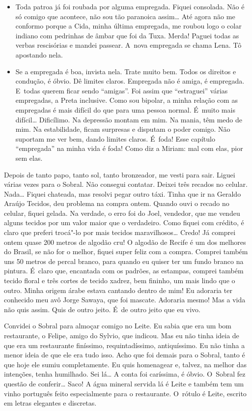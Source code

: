 \begin{itemize}
\item
  Toda patroa já foi roubada por alguma empregada. Fiquei consolada. Não
  é só comigo que acontece, não sou tão paranoica assim… Até
  agora não me conformo porque a Cida, minha última empregada, me roubou
  logo o colar indiano com pedrinhas de âmbar que foi da Tuxa. Merda!
  Paguei todas as verbas rescisórias e mandei passear. A~nova empregada
  se chama Lena. Tô apostando nela.
\item
  Se a empregada é boa, invista nela. Trate muito bem. Todos os direitos
  e condução, é óbvio. Dê limites claros. Empregada não é amiga, é
  empregada. E~todas querem ficar sendo ``amigas''. Foi assim que
  ``estraguei'' várias empregadas, a Preta inclusive. Como sou bipolar,
  a minha relação com as empregadas é mais difícil do que para uma
  pessoa normal. É~muito mais difícil… Dificílimo. Na depressão
  montam em mim. Na mania, têm medo de mim. Na estabilidade, ficam
  surpresas e disputam o poder comigo. Não suportam me ver bem, dando
  limites claros. É~foda! Esse capítulo ``empregada'' na minha vida é
  foda! Como diz a Miriam: mal com elas, pior sem elas.
\end{itemize}
Depois de tanto papo, tanto sol, tanto bronzeador, me vesti para sair.
Liguei várias vezes para o Sobral. Não consegui contatar. Deixei três
recados no celular. Nada… Fiquei chateada, mas resolvi pegar
outro táxi. Tinha que ir na Geraldo Araújo Tecidos, deu problema na
compra ontem. Quando ouvi o recado no celular, fiquei gelada. Na
verdade, o erro foi do Joel, vendedor, que me vendeu alguns tecidos por
um valor maior que o verdadeiro. Como fiquei com crédito, é claro que
preferi trocá"-lo por mais tecidos maravilhosos… Credo! Já comprei
ontem quase 200 metros de algodão cru! O algodão de Recife é um dos
melhores do Brasil, se não for o melhor, fiquei super feliz com a
compra. Comprei também uns 50 metros de percal branco, para quando eu
quiser ter um fundo branco na pintura. É~claro que, encantada com os
padrões, as estampas, comprei também tecido floral e três cortes de
tecido xadrez, bem fininho, um mais lindo que o outro. Minha origem
árabe estava cantando dentro de mim! Eu adoraria ter conhecido meu avô
Jorge Sawaya, que foi mascate. Adoraria mesmo! Mas a vida não quis
assim. Quis de outro jeito. É~de outro jeito que eu vivo.

Convidei o Sobral para almoçar comigo no Leite. Eu sabia que era um bom
restaurante, o Felipe, amigo do Sylvio, que indicou. Mas eu não tinha
ideia de que era um restaurante finíssimo, requintadíssimo,
antiquíssimo. Eu não tinha a menor ideia de que ele era tudo isso. Acho
que foi demais para o Sobral, tanto é que hoje ele sumiu completamente.
Eu quis homenagear e, talvez, na melhor das intenções, tenha humilhado.
Sei lá… A conta foi caríssima, é óbvio. O~Sobral fez questão de
conferir… Saco! A água mineral servida lá é Leite e também tem um
vinho português feito especialmente para o restaurante. O~rótulo é
Leite, escrito em letras elegantes e discretas.


